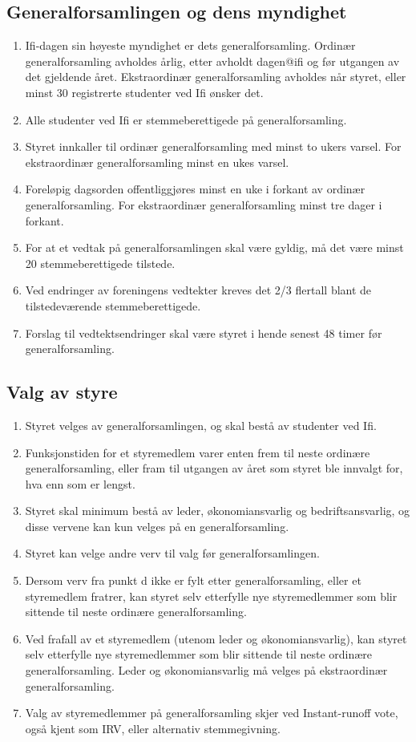 \documentclass[norsk,a4paper]{article}
\begin{document}
\subsection{Generalforsamlingen og dens myndighet}
\begin{enumerate}
    \item{Ifi-dagen sin høyeste myndighet er dets generalforsamling. Ordinær generalforsamling avholdes årlig, etter avholdt dagen@ifi og før utgangen av det gjeldende året. Ekstraordinær generalforsamling avholdes når styret, eller minst 30 registrerte studenter ved Ifi ønsker det.}
    \item{Alle studenter ved Ifi er stemmeberettigede på generalforsamling.}
    \item{Styret innkaller til ordinær generalforsamling med minst to ukers varsel. For ekstraordinær generalforsamling minst en ukes varsel.}
    \item{Foreløpig dagsorden offentliggjøres minst en uke i forkant av ordinær generalforsamling. For ekstraordinær generalforsamling minst tre dager i forkant.}
    \item{For at et vedtak på generalforsamlingen skal være gyldig, må det være minst 20 stemmeberettigede tilstede.}
    \item{Ved endringer av foreningens vedtekter kreves det 2/3 flertall blant de tilstedeværende stemmeberettigede.}
    \item{Forslag til vedtektsendringer skal være styret i hende senest 48 timer før generalforsamling.}
\end{enumerate}
\subsection{Valg av styre}
\begin{enumerate}
    \item{Styret velges av generalforsamlingen, og skal bestå av studenter ved Ifi.}
    \item{Funksjonstiden for et styremedlem varer enten frem til neste ordinære generalforsamling, eller fram til utgangen av året som styret ble innvalgt for, hva enn som er lengst.}
    \item{Styret skal minimum bestå av leder, økonomiansvarlig og bedriftsansvarlig, og disse vervene kan kun velges på en generalforsamling.}
    \item{Styret kan velge andre verv til valg før generalforsamlingen.}
    \item{Dersom verv fra punkt d ikke er fylt etter generalforsamling, eller et styremedlem fratrer, kan styret selv etterfylle nye styremedlemmer som blir sittende til neste ordinære generalforsamling.}
    \item{Ved frafall av et styremedlem (utenom leder og økonomiansvarlig), kan styret selv etterfylle nye styremedlemmer som blir sittende til neste ordinære generalforsamling. Leder og økonomiansvarlig må velges på ekstraordinær generalforsamling.}
    \item{Valg av styremedlemmer på generalforsamling skjer ved Instant-runoff vote, også kjent som IRV, eller alternativ stemmegivning.}
\end{enumerate}
\end{document}

